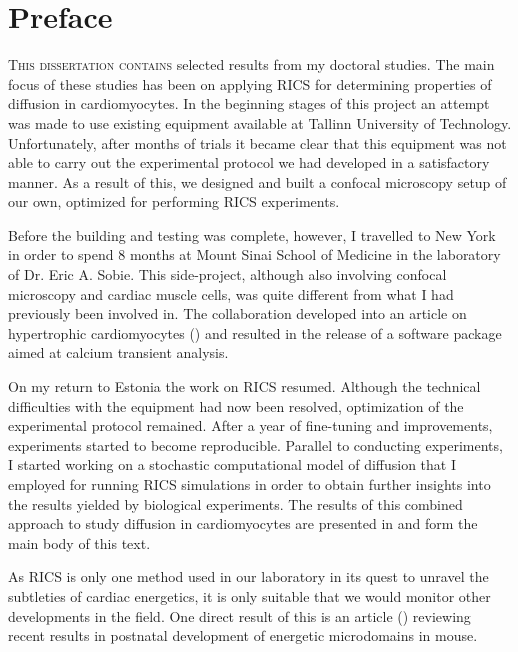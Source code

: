 \chapter*{Preface} \lettrine[lines=2, lhang=0.33, loversize=0.25]{T}{his
dissertation contains} selected results from my doctoral studies.  The
main focus of these studies has been on applying \ac{RICS} for
determining properties of diffusion in cardiomyocytes. In the beginning
stages of this project an attempt was made to use existing equipment
available at Tallinn University of Technology. Unfortunately, after
months of trials it became clear that this equipment was not able to
carry out the experimental protocol we had developed in a satisfactory
manner.  As a result of this, we designed and built a confocal
microscopy setup of our own, optimized for performing \ac{RICS}
experiments. 

Before the building and testing was complete, however, I travelled to
New York in order to spend 8 months at Mount Sinai School of Medicine in
the laboratory of Dr. Eric A. Sobie. This side-project, although also
involving confocal microscopy and cardiac muscle cells, was quite
different from what I had previously been involved in. The collaboration
developed into an article on hypertrophic cardiomyocytes (\PaperII) and
resulted in the release of a software package aimed at calcium transient
analysis.

On my return to Estonia the work on \ac{RICS} resumed. Although the
technical difficulties with the equipment had now been resolved,
optimization of the experimental protocol remained. After a year of
fine-tuning and improvements, experiments started to become
reproducible. Parallel to conducting experiments, I started working on a
stochastic computational model of diffusion that I employed for running
\ac{RICS} simulations \insilico in order to obtain further insights into
the results yielded by biological experiments. The results of this
combined approach to study diffusion in cardiomyocytes are presented in
\PaperIII and form the main body of this text. 

As \ac{RICS} is only one method used in our laboratory in its quest to
unravel the subtleties of cardiac energetics, it is only suitable that
we would monitor other developments in the field. One direct result of
this is an article (\PaperI) reviewing recent results in postnatal
development of energetic microdomains in mouse. 
\newpage

